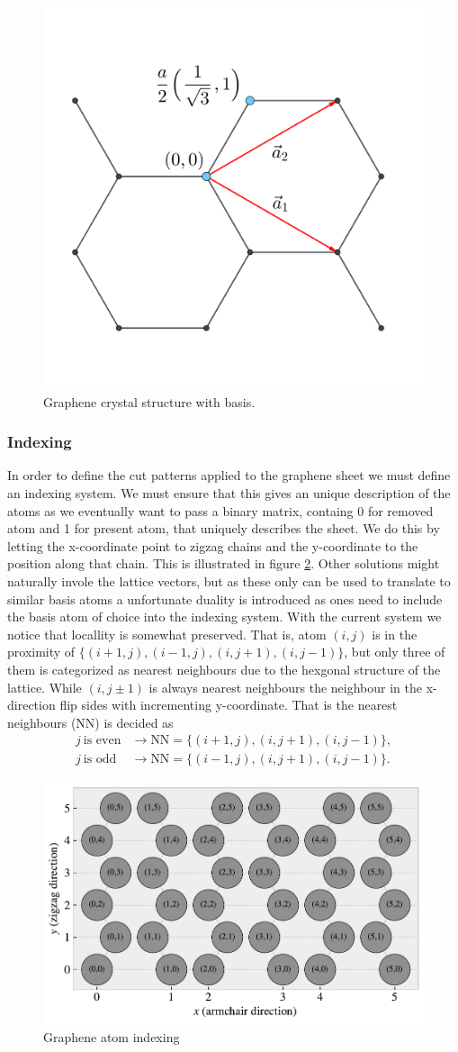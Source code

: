 \begin{figure}[H]
  \centering
  \includegraphics[width=0.3\linewidth]{figures/crystal.png}
  \caption{Graphene crystal structure with basis.}
  \label{fig:graphene_crystal}
\end{figure}



\subsubsection{Indexing}

In order to define the cut patterns applied to the graphene sheet we must define
an indexing system. We must ensure that this gives an unique description of the
atoms as we eventually want to pass a binary matrix, containg 0 for removed atom
and 1 for present atom, that uniquely describes the sheet. We do this by letting
the x-coordinate point to zigzag chains and the y-coordinate to the position
along that chain. This is illustrated in figure \ref{fig:atom_indexing}. Other
solutions might naturally invole the lattice vectors, but as these only can be
used to translate to similar basis atoms a unfortunate duality is introduced as
ones need to include the basis atom of choice into the indexing system. With the
current system we notice that locallity is somewhat preserved. That is, atom
$(i, j)$ is in the proximity of $\{(i+1, j), (i-1, j), (i, j+1), (i, j-1)\}$,
but only three of them is categorized as nearest neighbours due to the hexgonal
structure of the lattice. While $(i, j\pm 1)$ is always nearest neighbours the
neighbour in the x-direction flip sides with incrementing y-coordinate. That is
the nearest neighbours (NN) is decided as
\begin{align*}
  j \ \text{is even} &\rightarrow \text{NN} = \{(i+1, j), (i, j+1), (i, j-1)\}, \\
  j \ \text{is odd} &\rightarrow \text{NN} = \{(i-1, j), (i, j+1), (i, j-1)\}.
\end{align*}

\begin{figure}[H]
  \centering
  \includegraphics[width=0.7\linewidth]{figures/atom_indexing.pdf}
  \caption{Graphene atom indexing}
  \label{fig:atom_indexing}
\end{figure}

